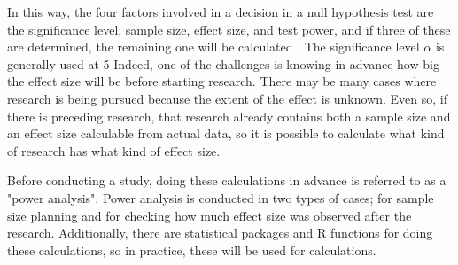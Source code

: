 \documentclass{ltjsbook}
\begin{document}

In this way, the four factors involved in a decision in a null hypothesis test are the significance level, sample size, effect size, and test power, and if three of these are determined, the remaining one will be calculated \parencite{Mizumoto2010}. The significance level $\alpha$ is generally used at 5%
Indeed, one of the challenges is knowing in advance how big the effect size will be before starting research. There may be many cases where research is being pursued because the extent of the effect is unknown. Even so, if there is preceding research, that research already contains both a sample size and an effect size calculable from actual data, so it is possible to calculate what kind of research has what kind of effect size.

Before conducting a study, doing these calculations in advance is referred to as a "power analysis". Power analysis is conducted in two types of cases; for sample size planning and for checking how much effect size was observed after the research. Additionally, there are statistical packages and R functions for doing these calculations, so in practice, these will be used for calculations.
\end{document}
